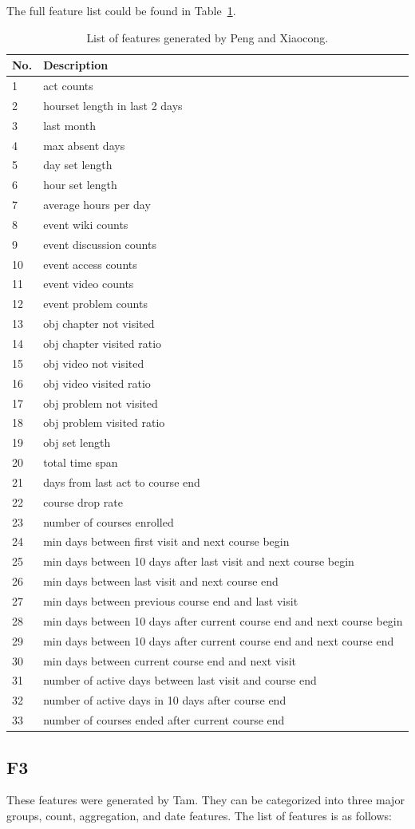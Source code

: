 The full feature list could be found in Table~\ref{tb:rwfeature}.

\begin{center}
  \begin{table}[ht]
    \begin{minipage}{\textwidth}
    {
      \small
      \hfill{}
      \begin{tabular}{|l|l|}
      \hline
      \textbf{No.}&\textbf{Description}\tabularnewline \hline
1 & act counts \tabularnewline
2 & hourset length in last 2 days \tabularnewline
3 & last month \tabularnewline
4 & max absent days \tabularnewline
5 & day set length \tabularnewline
6 & hour set length \tabularnewline
7 & average hours per day \tabularnewline
8 & event wiki counts \tabularnewline
9 & event discussion counts \tabularnewline
10 & event access counts \tabularnewline
11 & event video counts \tabularnewline
12 & event problem counts \tabularnewline
13 & obj chapter not visited \tabularnewline
14 & obj chapter visited ratio \tabularnewline
15 & obj video not visited \tabularnewline
16 & obj video visited ratio \tabularnewline
17 & obj problem not visited \tabularnewline
18 & obj problem visited ratio \tabularnewline
19 & obj set length \tabularnewline
20 & total time span \tabularnewline
21 & days from last act to course end \tabularnewline
22 & course drop rate \tabularnewline
23 & number of courses enrolled \tabularnewline
24 & min days between first visit and next course begin \tabularnewline
25 & min days between 10 days after last visit and next course begin \tabularnewline
26 & min days between last visit and next course end \tabularnewline
27 & min days between previous course end and last visit \tabularnewline
28 & min days between 10 days after current course end and next course begin \tabularnewline
29 & min days between 10 days after current course end and next course end \tabularnewline
30 & min days between current course end and next visit \tabularnewline
31 & number of active days between last visit and course end \tabularnewline
32 & number of active days in 10 days after course end \tabularnewline
33 & number of courses ended after current course end \tabularnewline
      \hline
      \end{tabular}
    }
    \hfill{}
    \caption{List of features generated by Peng and Xiaocong.}
    \label{tb:rwfeature}
    \end{minipage}
  \end{table}
\end{center}

\subsection{F3}
These features were generated by Tam. They can be categorized into three major groups, count, aggregation, and date features. The list of features is as follows:
